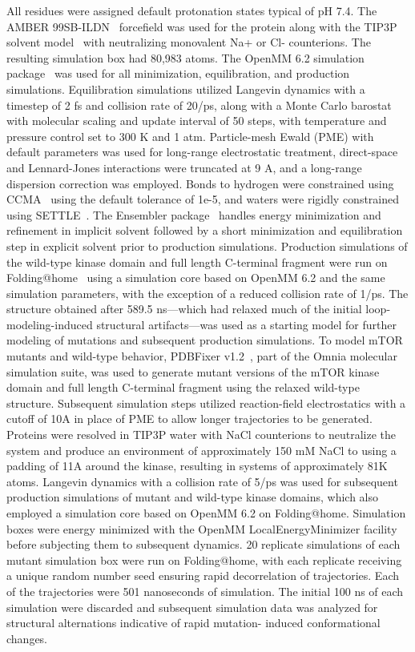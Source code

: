 \documentclass[phd,tocprelim]{cornell}
\begin{document}
All residues were assigned default protonation states typical of pH 7.4. The AMBER 99SB-ILDN~\citep{LindorffLarsen:2010ei} forcefield was used for the protein along with the TIP3P solvent model~\citep{Jorgensen:1998fl} with neutralizing monovalent Na+ or Cl- counterions. The resulting simulation box had 80,983 atoms. The OpenMM 6.2 simulation package~\citep{Eastman:2017kn} was used for all minimization, equilibration, and production simulations. Equilibration simulations utilized Langevin dynamics with a timestep of 2 fs and collision rate of 20/ps, along with a Monte Carlo barostat with molecular scaling and update interval of 50 steps, with temperature and pressure control set to 300 K and 1 atm. Particle-mesh Ewald (PME) with default parameters was used for long-range electrostatic treatment, direct-space and Lennard-Jones interactions were truncated at 9 A, and a long-range dispersion correction was employed. Bonds to hydrogen were constrained using CCMA~\citep{Eastman:2010hq} using the default tolerance of 1e-5, and waters were rigidly constrained using SETTLE~\citep{Miyamoto:1992fx}. The Ensembler package~\citep{Parton:2016cc} handles energy minimization and refinement in implicit solvent followed by a short minimization and equilibration step in explicit solvent prior to production simulations.
Production simulations of the wild-type kinase domain and full length C-terminal fragment were run on Folding@home~\citep{Shirts:2000du} using a simulation core based on OpenMM 6.2 and the same simulation parameters, with the exception of a reduced collision rate of 1/ps. The structure obtained after 589.5 ns---which had relaxed much of the initial loop-modeling-induced structural artifacts---was used as a starting model for further modeling of mutations and subsequent production simulations.
To model mTOR mutants and wild-type  behavior, PDBFixer v1.2~\citep{Eastman:2013bo}, part of the Omnia molecular simulation suite, was used to generate mutant versions of the mTOR kinase domain and full length C-terminal fragment using the relaxed wild-type structure. Subsequent simulation steps utilized reaction-field electrostatics with a cutoff of 10A in place of PME to allow longer trajectories to be generated. Proteins were resolved in TIP3P water with NaCl counterions to neutralize the system and produce an environment of approximately 150 mM NaCl to using a padding of 11A around the kinase, resulting in systems of approximately 81K atoms. Langevin dynamics with a collision rate of 5/ps was used for subsequent production simulations of mutant and wild-type kinase domains, which also employed a simulation core based on OpenMM 6.2 on Folding@home. Simulation boxes were energy minimized with the OpenMM LocalEnergyMinimizer facility before subjecting them to subsequent dynamics.
20 replicate simulations of each mutant simulation box were run on Folding@home, with each replicate receiving a unique random number seed ensuring rapid decorrelation of trajectories. Each of the trajectories were 501 nanoseconds of simulation. The initial 100 ns of each simulation were discarded and subsequent simulation data was analyzed for structural alternations indicative of rapid mutation- induced conformational changes.
\end{document}
